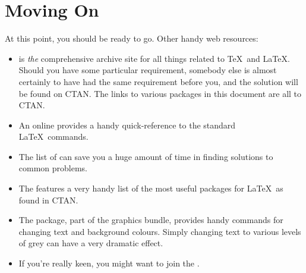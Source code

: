 \section{Moving On}
\label{sec:MovingOn}

At this point, you should be ready to go.  Other handy web resources:
\begin{itemize}
\item {} is \emph{the} comprehensive
    archive site for all things related to \TeX\ and \LaTeX. 
    Should you have some particular requirement, somebody else is
    almost certainly to have had the same requirement before you,
    and the solution will be found on \ac{CTAN}.  The links to
    various packages in this document are all to \ac{CTAN}.

\item An online
     provides a handy quick-reference
    to the standard \LaTeX\ commands.

\item The list of 
    can save you a huge amount of time in finding solutions to
    common problems.

\item The  features a very handy list of the most useful
    packages for \LaTeX\ as found in \ac{CTAN}.

\item The
    package, part of the graphics bundle, provides handy commands
    for changing text and background colours.  Simply changing
    text to various levels of grey can have a very 
    \textcolor{greytext}{dramatic effect}.


\item If you're really keen, you might want to join the
    .

\end{itemize}

\endinput
